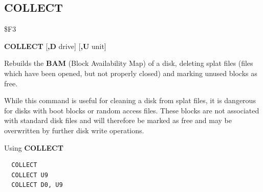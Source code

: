 \subsection{COLLECT}
\begin{description}[leftmargin=2cm,style=nextline]
\item [Token:] \$F3
\item [Format:] {\bf COLLECT} [{\bf,D} drive] [{\bf,U} unit]
\item [Usage:]
   Rebuilds the {\bf BAM}
   (Block Availability Map) of a disk, deleting splat files (files which have been opened,
   but not properly closed) and marking unused blocks as free.

   \drivedefinition

   \unitdefinition

\item [Remarks:]
   While this command is useful for cleaning a disk from
   splat files, it is dangerous for disks with boot blocks or random access files.
   These blocks are not associated with standard disk files
   and will therefore be marked as free and may be overwritten
   by further disk write operations.


\item [Examples:] Using {\bf COLLECT}
\begin{tcolorbox}[colback=black,coltext=white]
\verbatimfont{\codefont}
\begin{verbatim}
  COLLECT
  COLLECT U9
  COLLECT D0, U9
\end{verbatim}
\end{tcolorbox}
\end{description}


\newpage
